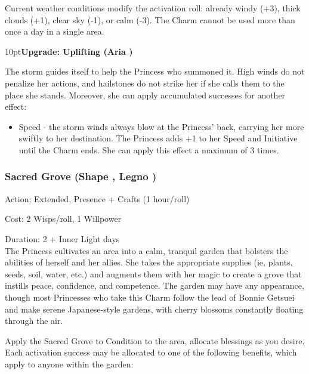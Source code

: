 Current weather conditions modify the activation roll: already windy (+3), thick clouds (+1), clear sky (-1), or calm (-3). The Charm cannot be used more than once a day in a single area.

\begin{myindentpar}{10pt}\textbf{Upgrade: Uplifting (Aria \textbullet\textbullet\textbullet\textbullet)}

The storm guides itself to help the Princess who summoned it. High winds do not penalize her actions, and hailstones do not strike her if she calls them to the place she stands. Moreover, she can apply accumulated successes for another effect:

\begin{itemize}\item    Speed - the storm winds always blow at the Princess' back, carrying her more swiftly to her destination. The Princess adds +1 to her Speed and Initiative until the Charm ends. She can apply this effect a maximum of 3 times.\end{itemize}\end{myindentpar}

\subsubsection*{Sacred Grove (Shape \textbullet\textbullet\textbullet\textbullet, Legno  \textbullet\textbullet\textbullet)}

\noindent Action: Extended, Presence + Crafts (1 hour/roll)

\noindent Cost: 2 Wisps/roll, 1 Willpower

\noindent Duration: 2 + Inner Light days \\

\noindent The Princess cultivates an area into a calm, tranquil garden that bolsters the abilities of herself and her allies. She takes the appropriate supplies (ie, plants, seeds, soil, water, etc.) and augments them with her magic to create a grove that instills peace, confidence, and competence. The garden may have any appearance, though most Princesses who take this Charm follow the lead of Bonnie Getsuei and make serene Japanese-style gardens, with cherry blossoms constantly floating through the air. 

Apply the Sacred Grove to Condition to the area, allocate blessings as you desire. Each activation success may be allocated to one of the following benefits, which apply to anyone within the garden:


